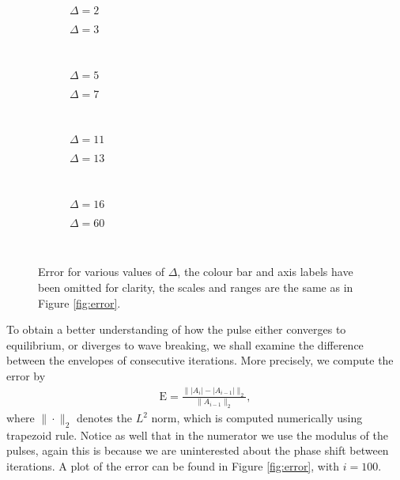 \begin{figure}[p]
\begin{subfigure}{0.5\textwidth}

\caption{$\Delta = 2$}
\end{subfigure}
\begin{subfigure}{0.5\textwidth}

\caption{$\Delta = 3$}
\end{subfigure} \\
\begin{subfigure}{0.5\textwidth}

\caption{$\Delta = 5$}
\end{subfigure}
\begin{subfigure}{0.5\textwidth}

\caption{$\Delta = 7$}
\end{subfigure} \\
\begin{subfigure}{0.5\textwidth}

\caption{$\Delta = 11$}
\end{subfigure}
\begin{subfigure}{0.5\textwidth}

\caption{$\Delta = 13$}
\end{subfigure} \\
\begin{subfigure}{0.5\textwidth}

\caption{$\Delta = 16$}
\end{subfigure}
\begin{subfigure}{0.5\textwidth}

\caption{$\Delta = 60$}
\end{subfigure} \\
\caption{Error for various values of $\Delta$, the colour bar and axis labels have been omitted for clarity, the scales and ranges are the same as in Figure \ref{fig:error}.}
\label{fig:deltaerror}
\end{figure}

To obtain a better understanding of how the pulse either converges to equilibrium, or diverges to wave breaking, we shall examine the difference between the envelopes of consecutive iterations. More precisely, we compute the error by
\begin{align}
\textrm{E} = \frac{\| |A_i| - |A_{i-1}| \|_2}{\| A_{i-1} \|_2},
\label{eq:error}
\end{align}
where $\| \cdot \|_2$ denotes the $L^2$ norm, which is computed numerically using trapezoid rule. Notice as well that in the numerator we use the modulus of the pulses, again this is because we are uninterested about the phase shift between iterations. A plot of the error can be found in Figure \ref{fig:error}, with $i = 100$. \\

